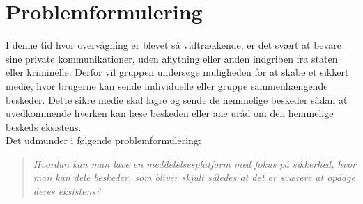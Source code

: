 \section{Problemformulering}
I denne tid hvor overvågning er blevet så vidtrækkende, er det svært at bevare sine private kommunikationer, uden aflytning eller anden indgriben fra staten eller kriminelle. Derfor vil gruppen undersøge muligheden for at skabe et sikkert medie, hvor brugerne kan sende individuelle eller gruppe sammenhængende beskeder. Dette sikre medie skal lagre og sende de hemmelige beskeder sådan at uvedkommende hverken kan læse beskeden eller ane uråd om den hemmelige beskeds eksistens. 
\\Det udmunder i følgende problemformulering:
\begin{quote}
\textit{Hvordan kan man lave en meddelelsesplatform med fokus på sikkerhed, hvor man kan dele beskeder, som bliver skjult således at det er sværere at opdage deres eksistens?}
\end{quote}
